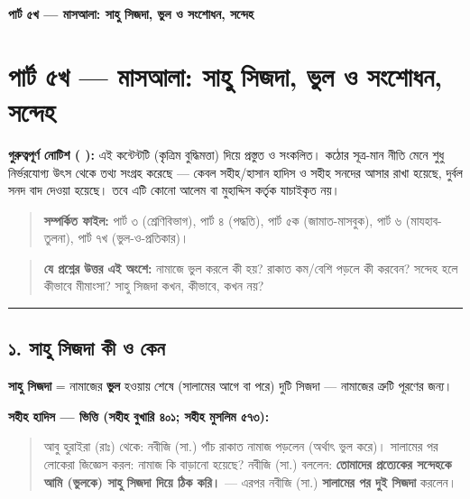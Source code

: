 

\begin{center}{\Large\bfseries\color{emerald} পার্ট ৫খ — মাসআলা: সাহু সিজদা, ভুল ও সংশোধন, সন্দেহ}\end{center}
\vspace{1em}
\section*{পার্ট ৫খ — মাসআলা: সাহু সিজদা, ভুল ও সংশোধন, সন্দেহ}

\begin{warnbox}
 \textbf{গুরুত্বপূর্ণ নোটিশ ( ):} এই কন্টেন্টটি  (কৃত্রিম বুদ্ধিমত্তা) দিয়ে প্রস্তুত ও সংকলিত।  কঠোর সূত্র-মান নীতি মেনে শুধু নির্ভরযোগ্য উৎস থেকে তথ্য সংগ্রহ করেছে — কেবল সহীহ/হাসান হাদিস ও সহীহ সনদের আসার রাখা হয়েছে, দুর্বল সনদ বাদ দেওয়া হয়েছে। তবে এটি কোনো আলেম বা মুহাদ্দিস কর্তৃক যাচাইকৃত নয়।
\end{warnbox}

\begin{quote}
\textbf{সম্পর্কিত ফাইল:} পার্ট ৩ (শ্রেণিবিভাগ), পার্ট ৪ (পদ্ধতি), পার্ট ৫ক (জামাত-মাসবুক), পার্ট ৬ (মাযহাব-তুলনা), পার্ট ৭খ (ভুল-ও-প্রতিকার)।
\end{quote}

\begin{quote}
\textbf{যে প্রশ্নের উত্তর এই অংশে:} নামাজে ভুল করলে কী হয়? রাকাত কম/বেশি পড়লে কী করবেন? সন্দেহ হলে কীভাবে মীমাংসা? সাহু সিজদা কখন, কীভাবে, কখন নয়?
\end{quote}

\medskip\hrule\medskip

\subsection*{১. সাহু সিজদা কী ও কেন}

\textbf{সাহু সিজদা} = নামাজের \textbf{ভুল} হওয়ায় শেষে (সালামের আগে বা পরে) দুটি সিজদা — নামাজের ত্রুটি পূরণের জন্য।

\textbf{সহীহ হাদিস — ভিত্তি (সহীহ বুখারি ৪০১; সহীহ মুসলিম ৫৭৩):}

\begin{quote}
আবু হুরাইরা (রাঃ) থেকে: নবীজি (সা.) পাঁচ রাকাত নামাজ পড়লেন (অর্থাৎ ভুল করে)। সালামের পর লোকেরা জিজ্ঞেস করল: নামাজ কি বাড়ানো হয়েছে? নবীজি (সা.) বললেন: \textbf{তোমাদের প্রত্যেকের সন্দেহকে আমি (ভুলকে) সাহু সিজদা দিয়ে ঠিক করি।} — এরপর নবীজি (সা.) \textbf{সালামের পর দুই সিজদা} করলেন।
\end{quote}

